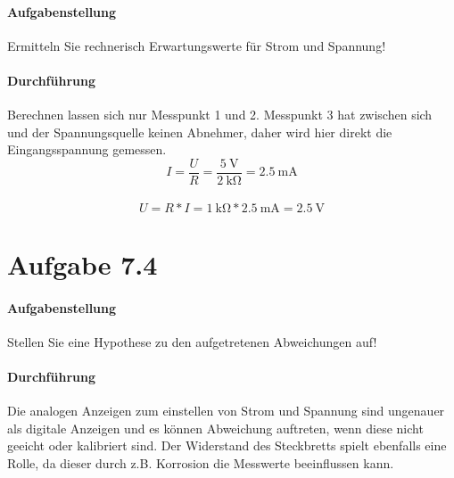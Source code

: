 \paragraph{Aufgabenstellung}
Ermitteln Sie rechnerisch Erwartungswerte für Strom und Spannung!

\paragraph{Durchführung}
Berechnen lassen sich nur Messpunkt 1 und 2. Messpunkt 3 hat zwischen sich und der Spannungsquelle keinen Abnehmer, daher wird hier direkt die Eingangsspannung gemessen. \\
\[I=\frac{U}{R}=\frac{\SI{5}{\volt}}{\SI{2}{\kilo\ohm}}=\SI{2,5}{\milli\ampere}\] \\
\[U=R*I=\SI{1}{\kilo\ohm}*\SI{2,5}{\milli\ampere}=\SI{2,5}{\volt}\]

\section{Aufgabe 7.4}
\paragraph{Aufgabenstellung}
Stellen Sie eine Hypothese zu den aufgetretenen Abweichungen auf!

\paragraph{Durchführung}
Die analogen Anzeigen zum einstellen von Strom und Spannung sind ungenauer als digitale Anzeigen und es können Abweichung auftreten, wenn diese nicht geeicht oder kalibriert sind. Der Widerstand des Steckbretts spielt ebenfalls eine Rolle, da dieser durch z.B. Korrosion die Messwerte beeinflussen kann.